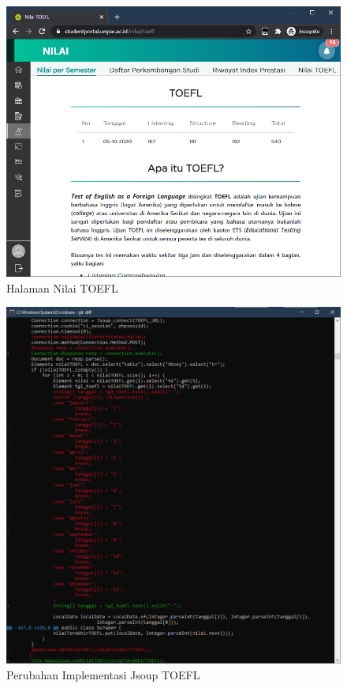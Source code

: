 \begin{itemize}
       \begin{figure}[H]
        	\centering
        	\includegraphics[scale=0.45]{Gambar/nilai_toefl.png}
        	\caption{Halaman Nilai TOEFL} 
        	\label{fig:3_toefl}
        \end{figure}
        
        \begin{figure}[H]
        	\centering
        	\includegraphics[scale=0.52]{Gambar/diff_toefl.png}
        	\caption{Perubahan Implementasi Jsoup TOEFL} 
        	\label{fig:3_diff_toefl}
        \end{figure}
        
        
    \end{itemize}



